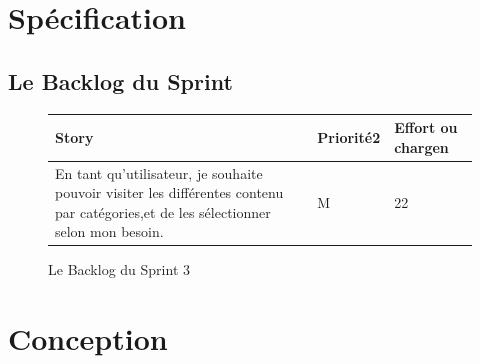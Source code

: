 \section{Spécification}
\subsection{Le Backlog du Sprint}
\begin{figure}[H]
\begin{tabular}{|p{7cm}|p{4cm}|p{4cm}|}
\hline
\textbf{Story} & \textbf{Priorité2 } & \textbf{Effort ou chargen} \\
\hline
En tant qu'utilisateur, je souhaite pouvoir visiter les différentes contenu par catégories,et de les sélectionner selon mon besoin. & \begin{center}M\end{center} & \begin{center}22\end{center}\\
\hline
\end{tabular}
  \caption{Le Backlog du Sprint 3}
  \label{fig:Backlog3}
\end{figure}
\section{Conception}
